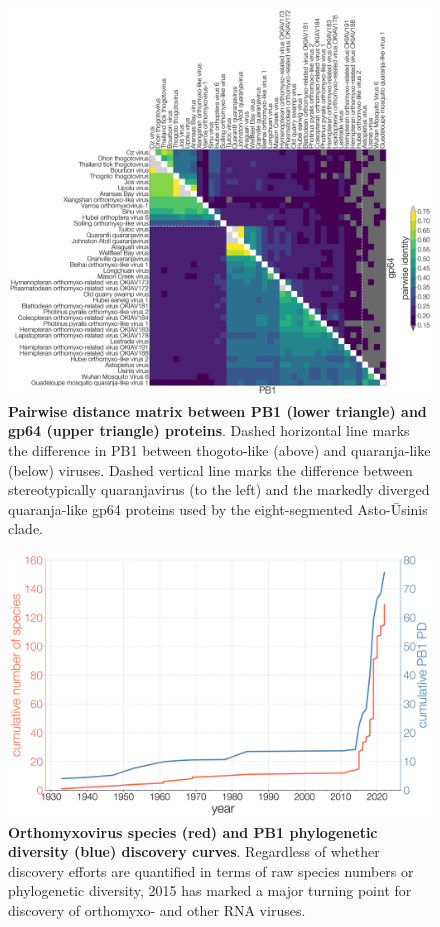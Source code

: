 \documentclass[11pt,twocolumn]{article}
\begin{document}
\begin{figure}
\centering
\includegraphics[width=\textwidth]{SuppFig6_idMatrix.png}
\caption{
\textbf{Pairwise distance matrix between PB1 (lower triangle) and gp64 (upper triangle) proteins}.
Dashed horizontal line marks the difference in PB1 between thogoto-like (above) and quaranja-like (below) viruses.
Dashed vertical line marks the difference between stereotypically quaranjavirus (to the left) and the markedly diverged quaranja-like gp64 proteins used by the eight-segmented Asto-\={U}sinis clade.
}
\end{figure}

\begin{figure}
\centering
\includegraphics[width=\textwidth]{SuppFig7_PD.png}
\caption{
\textbf{Orthomyxovirus species (red) and PB1 phylogenetic diversity (blue) discovery curves}.
Regardless of whether discovery efforts are quantified in terms of raw species numbers or phylogenetic diversity, 2015 has marked a major turning point for discovery of orthomyxo- and other RNA viruses.
}
\end{figure}

% 
\end{document}
